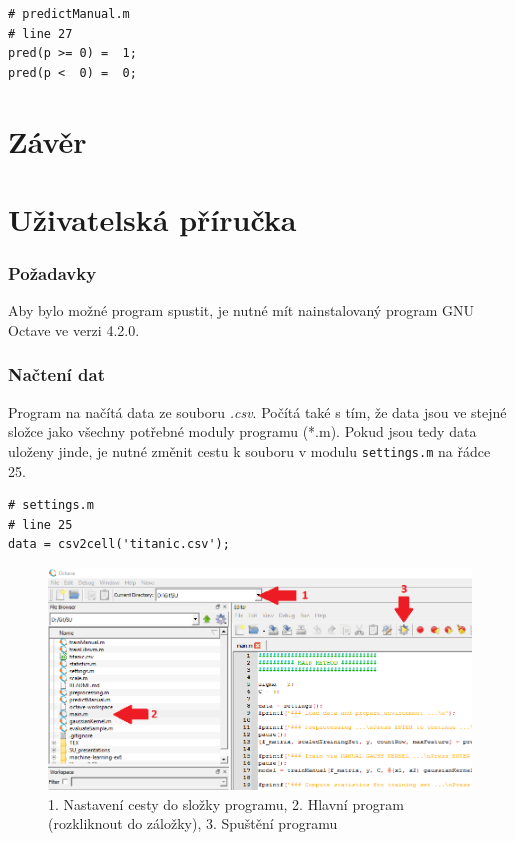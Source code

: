 \documentclass[a4]{article}
\begin{document}
\begin{lstlisting}
# predictManual.m
# line 27
pred(p >= 0) =  1;
pred(p <  0) =  0;
\end{lstlisting} 

\section{Závěr}

\section{Uživatelská příručka}
\subsubsection{Požadavky}
Aby bylo možné program spustit, je nutné mít nainstalovaný program GNU Octave ve verzi 4.2.0.

\subsubsection{Načtení dat}
Program na načítá data ze souboru \textit{.csv}. Počítá také s tím, že data jsou ve stejné složce jako všechny potřebné moduly programu (*.m). Pokud jsou tedy data uloženy jinde, je nutné změnit cestu k souboru v modulu \texttt{settings.m} na řádce 25.

\begin{lstlisting}
# settings.m
# line 25
data = csv2cell('titanic.csv');
\end{lstlisting}

\begin{figure}[!ht]
	\centering
		\includegraphics[width=\textwidth]{images/runWithGUI}
	\caption{1. Nastavení cesty do složky programu, 2. Hlavní program (rozkliknout do záložky), 3. Spuštění programu}
	\label{fig:runWithGUI}
\end{figure}
\end{document}
